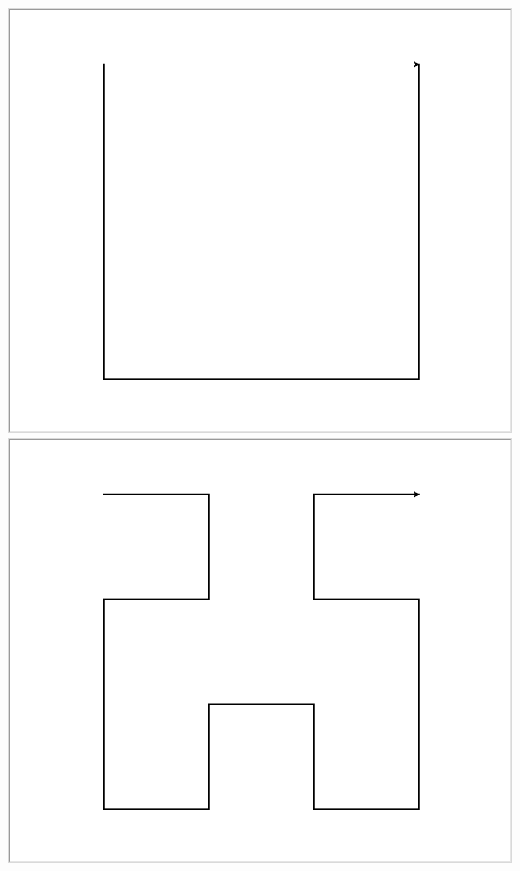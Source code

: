 \documentclass[11pt,class=report,crop=false]{standalone}
\begin{document}
\begin{activite}
\begin{enumerate}
   \begin{center}
\includegraphics[scale=\myscale,scale=0.14]{ecran_tortue_hilbert1}\quad 
\includegraphics[scale=\myscale,scale=0.14]{ecran_tortue_hilbert2}\quad

\end{center}
\end{enumerate}
\end{activite}
\end{document}
